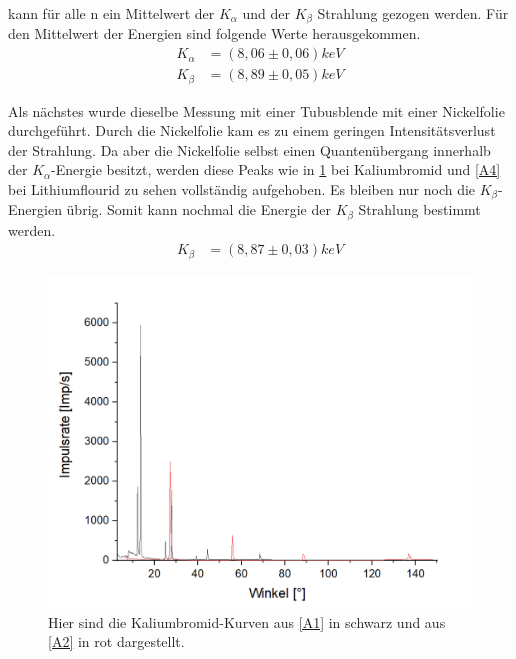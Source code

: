\documentclass[
	a4paper,
	12pt,
	pagesize,
	ngerman
]{scrartcl}
\begin{document}
kann für alle n ein Mittelwert der $K_{\alpha}$ und der $K_{\beta}$ Strahlung gezogen werden. Für den Mittelwert der Energien sind folgende Werte herausgekommen.
\begin{align*}
    K_{\alpha} &= (8,06 \pm 0,06) keV \\
    K_{\beta} &= (8,89 \pm 0,05) keV
\end{align*}

Als nächstes wurde dieselbe Messung mit einer Tubusblende mit einer Nickelfolie durchgeführt. Durch die Nickelfolie kam es zu einem geringen Intensitätsverlust der Strahlung. Da aber die Nickelfolie selbst einen Quantenübergang innerhalb der $K_{\alpha}$-Energie besitzt, werden diese Peaks wie in \cref{A3} bei Kaliumbromid und \cref{A4} bei Lithiumflourid zu sehen vollständig aufgehoben. Es bleiben nur noch die $K_{\beta}$-Energien übrig.
Somit kann nochmal die Energie der $K_{\beta}$ Strahlung bestimmt werden. 
\begin{align*}
    K_{\beta} &= (8,87 \pm 0,03)keV
\end{align*}
\begin{figure}[h!]
    \centering
    \includegraphics[scale = 0.6]{mono-normal.png}
    \caption{Hier sind die Kaliumbromid-Kurven aus \cref{A1} in schwarz und aus \cref{A2} in rot dargestellt.}
    \label{A3}
\end{figure}
\end{document}
